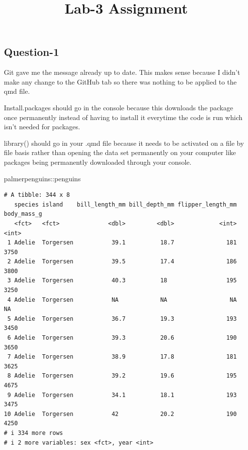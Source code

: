 \documentclass[
  letterpaper,
  DIV=11,
  numbers=noendperiod]{scrartcl}
\title{Lab-3 Assignment}
\author{}
\date{}
\newenvironment{Shaded}{\begin{snugshade}}{\end{snugshade}}
\newcommand{\NormalTok}[1]{\textcolor[rgb]{0.00,0.23,0.31}{#1}}
\newcommand{\SpecialCharTok}[1]{\textcolor[rgb]{0.37,0.37,0.37}{#1}}
\begin{document}
\maketitle


\subsection{Question-1}\label{question-1}

Git gave me the message already up to date. This makes sense because I
didn't make any change to the GitHub tab so there was nothing to be
applied to the qmd file.

Install.packages should go in the console because this downloads the
package once permanently instead of having to install it everytime the
code is run which isn't needed for packages.

library() should go in your .qmd file because it needs to be activated
on a file by file basis rather than opening the data set permanently on
your computer like packages being permanently downloaded through your
console.

\begin{Shaded}
\begin{Highlighting}[]
\NormalTok{palmerpenguins}\SpecialCharTok{::}\NormalTok{penguins}
\end{Highlighting}
\end{Shaded}

\begin{verbatim}
# A tibble: 344 x 8
   species island    bill_length_mm bill_depth_mm flipper_length_mm body_mass_g
   <fct>   <fct>              <dbl>         <dbl>             <int>       <int>
 1 Adelie  Torgersen           39.1          18.7               181        3750
 2 Adelie  Torgersen           39.5          17.4               186        3800
 3 Adelie  Torgersen           40.3          18                 195        3250
 4 Adelie  Torgersen           NA            NA                  NA          NA
 5 Adelie  Torgersen           36.7          19.3               193        3450
 6 Adelie  Torgersen           39.3          20.6               190        3650
 7 Adelie  Torgersen           38.9          17.8               181        3625
 8 Adelie  Torgersen           39.2          19.6               195        4675
 9 Adelie  Torgersen           34.1          18.1               193        3475
10 Adelie  Torgersen           42            20.2               190        4250
# i 334 more rows
# i 2 more variables: sex <fct>, year <int>
\end{verbatim}
\end{document}
